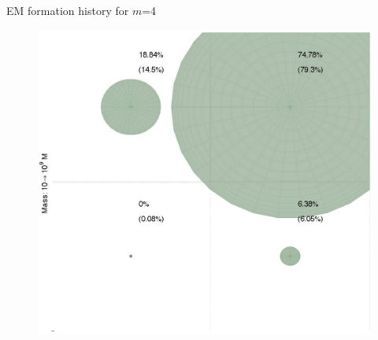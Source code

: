 \documentclass{beamer}
\begin{document}
\begin{frame}{EM formation history for $m$=4}
	
	\begin{figure}
			\begin{center}
				\includegraphics[scale=0.3]{fh2x2.pdf}
			\end{center}
	\end{figure}

	
\end{frame}
\end{document}
